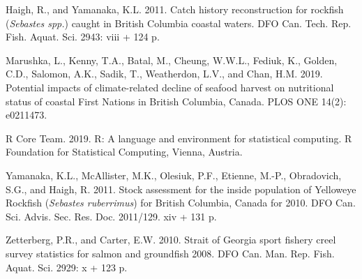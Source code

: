 \documentclass[11pt]{book}
\begin{document}
\leavevmode\hypertarget{ref-haigh2011}{}%
Haigh, R., and Yamanaka, K.L. 2011. Catch history reconstruction for rockfish (\emph{Sebastes spp.}) caught in British Columbia coastal waters. DFO Can. Tech. Rep. Fish. Aquat. Sci. 2943: viii + 124 p.

\leavevmode\hypertarget{ref-marushka2019}{}%
Marushka, L., Kenny, T.A., Batal, M., Cheung, W.W.L., Fediuk, K., Golden, C.D., Salomon, A.K., Sadik, T., Weatherdon, L.V., and Chan, H.M. 2019. Potential impacts of climate-related decline of seafood harvest on nutritional status of coastal First Nations in British Columbia, Canada. PLOS ONE 14(2): e0211473.

\leavevmode\hypertarget{ref-r2019}{}%
R Core Team. 2019. R: A language and environment for statistical computing. R Foundation for Statistical Computing, Vienna, Austria.

\leavevmode\hypertarget{ref-yamanaka2011}{}%
Yamanaka, K.L., McAllister, M.K., Olesiuk, P.F., Etienne, M.-P., Obradovich, S.G., and Haigh, R. 2011. Stock assessment for the inside population of Yelloweye Rockfish (\emph{Sebastes ruberrimus}) for British Columbia, Canada for 2010. DFO Can. Sci. Advis. Sec. Res. Doc. 2011/129. xiv + 131 p.

\leavevmode\hypertarget{ref-zetterberg2010}{}%
Zetterberg, P.R., and Carter, E.W. 2010. Strait of Georgia sport fishery creel survey statistics for salmon and groundfish 2008. DFO Can. Man. Rep. Fish. Aquat. Sci. 2929: x + 123 p.
\end{document}
